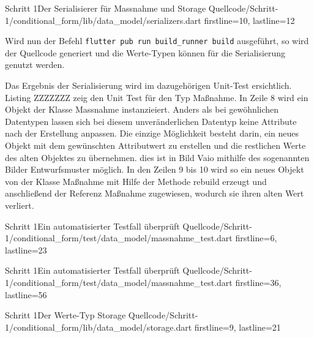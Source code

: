 \begin{alexlistingzwei}{Schritt 1}{Der Serialisierer für Massnahme und Storage}
  {Quellcode/Schritt-1/conditional_form/lib/data_model/serializers.dart}
  {firstline=10, lastline=12}
  \label{lst:Schritt1Serialisierer}
\end{alexlistingzwei}



Wird nun der Befehl \texttt{flutter pub run build_runner build} ausgeführt, so wird der Quellcode generiert und die Werte-Typen können für die Serialisierung genutzt werden.

Das Ergebnis der Serialisierung wird im dazugehörigen Unit-Test ersichtlich. Listing ZZZZZZZ zeig den Unit Test für den Typ Maßnahme.
In Zeile 8 wird ein Objekt der Klasse Massnahme instanzieiert. Anders als bei gewöhnlichen Datentypen lassen sich bei diesem unveränderlichen Datentyp keine Attribute nach der Erstellung anpassen. Die einzige Möglichkeit besteht darin, ein neues Objekt  mit dem gewünschten Attributwert zu erstellen und die  restlichen Werte des alten Objektes zu übernehmen.  dies ist in Bild Vaio mithilfe des sogenannten Bilder Entwurfsmuster möglich. In den Zeilen 9 bis 10 wird so ein neues Objekt von der Klasse Maßnahme mit Hilfe der Methode rebuild erzeugt und anschließend der Referenz Maßnahme zugewiesen, wodurch sie ihren alten Wert verliert.





\begin{alexlistingzwei}{Schritt 1}{Ein automatisierter Testfall überprüft}
  {Quellcode/Schritt-1/conditional_form/test/data_model/massnahme_test.dart}
  {firstline=6, lastline=23}
  \label{lst:MaßnahmeSerialisiertOhneFehlerUnitTest}
\end{alexlistingzwei}

\begin{alexlistingzwei}{Schritt 1}{Ein automatisierter Testfall überprüft}
  {Quellcode/Schritt-1/conditional_form/test/data_model/massnahme_test.dart}
  {firstline=36, lastline=56}
  \label{lst:MaßnahmeDeserialisiertOhneFehlerUnitTest}
\end{alexlistingzwei}





\begin{alexlistingzwei}{Schritt 1}{Der Werte-Typ Storage}
  {Quellcode/Schritt-1/conditional_form/lib/data_model/storage.dart}
  {firstline=9, lastline=21}
  \label{lst:Schritt1WerteTypStorage}
\end{alexlistingzwei}




